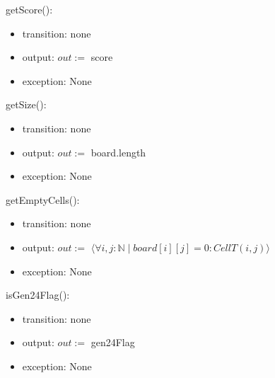 \documentclass[12pt]{article}
\begin{document}
\noindent getScore():
\begin{itemize}
\item transition: none
\item output: $out :=$ score
\item exception: None
\end{itemize}

\noindent getSize():
\begin{itemize}
\item transition: none
\item output: $out :=$ board.length
\item exception: None
\end{itemize}

\noindent getEmptyCells():
\begin{itemize}
\item transition: none
\item output: $out :=$ $\langle \forall i, j : \mathbb{N} \mid board[i][j] = 0 : CellT(i, j) \rangle$
\item exception: None
\end{itemize}

\noindent isGen24Flag():
\begin{itemize}
\item transition: none
\item output: $out :=$ gen24Flag
\item exception: None
\end{itemize}
\end{document}
